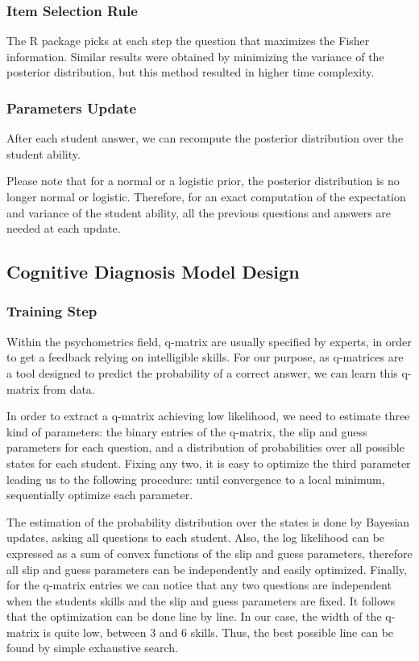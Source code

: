 \documentclass{sig-alternate}
\begin{document}
\subsubsection{Item Selection Rule}

The R package picks at each step the question that maximizes the Fisher information. Similar results were obtained by minimizing the variance of the posterior distribution, but this method resulted in higher time complexity.

\subsubsection{Parameters Update}

After each student answer, we can recompute the posterior distribution over the student ability.

Please note that for a normal or a logistic prior, the posterior distribution is no longer normal or logistic. Therefore, for an exact computation of the expectation and variance of the student ability, all the previous questions and answers are needed at each update.

\subsection{Cognitive Diagnosis Model Design}

\subsubsection{Training Step}

Within the psychometrics field, q-matrix are usually specified by experts, in order to get a feedback relying on intelligible skills. For our purpose, as q-matrices are a tool designed to predict the probability of a correct answer, we can learn this q-matrix from data.

In order to extract a q-matrix achieving low likelihood, we need to estimate three kind of parameters: the binary entries of the q-matrix, the slip and guess parameters for each question, and a distribution of probabilities over all possible states for each student. Fixing any two, it is easy to optimize the third parameter leading us to the following procedure: until convergence to a local minimum, sequentially optimize each parameter.

The estimation of the probability distribution over the states is done by Bayesian updates, asking all questions to each student. Also, the log likelihood can be expressed as a sum of convex functions of the slip and guess parameters, therefore all slip and guess parameters can be independently and easily optimized. Finally, for the q-matrix entries we can notice that any two questions are independent when the students skills and the slip and guess parameters are fixed. It follows that the optimization can be done line by line. In our case, the width of the q-matrix is quite low, between 3 and 6 skills. Thus, the best possible line can be found by simple exhaustive search.
\end{document}
